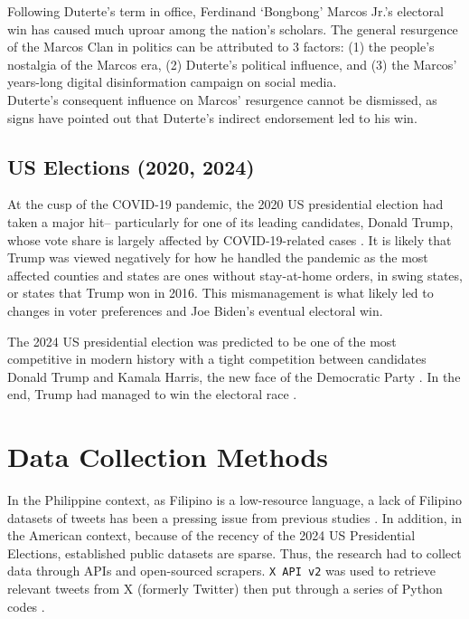 Following Duterte’s term in office, Ferdinand ‘Bongbong’ Marcos Jr.’s electoral win has caused much uproar among the nation’s scholars. The general resurgence of the Marcos Clan in politics can be attributed to 3 factors: (1) the people’s nostalgia of the Marcos era, (2) Duterte’s political influence, and (3) the Marcos’ years-long digital disinformation campaign on social media\cite{RRL_Pernia-2025}. \\Duterte’s consequent influence on Marcos’ resurgence cannot be dismissed, as signs have pointed out that Duterte’s indirect endorsement led to his win\cite{RRL_Dulay-2023}.

\subsection{US Elections (2020, 2024)}
At the cusp of the COVID-19 pandemic, the 2020 US presidential election had taken a major hit– particularly for one of its leading candidates, Donald Trump, whose vote share is largely affected by COVID-19-related cases \cite{RRL_Baccini-2021}. It is likely that Trump was viewed negatively for how he handled the pandemic as the most affected counties and states are ones without stay-at-home orders, in swing states, or states that Trump won in 2016. This mismanagement is what likely led to changes in voter preferences and Joe Biden’s eventual electoral win.

The 2024 US presidential election was predicted to be one of the most competitive in modern history with a tight competition between candidates Donald Trump and Kamala Harris, the new face of the Democratic Party \cite{RRL_Setiawan-2025}. In the end, Trump had managed to win the electoral race \cite{RRL_Setiawan-2025}.

\section{Data Collection Methods}
In the Philippine context, as Filipino is a low-resource language, a lack of Filipino datasets of tweets has been a pressing issue from previous studies \cite{RRL_Aquino-2025}. In addition, in the American context, because of the recency of the 2024 US Presidential Elections, established public datasets are sparse. Thus, the research had to collect data through APIs and open-sourced scrapers. \texttt{X API v2} was used to retrieve relevant tweets from X (formerly Twitter) then put through a series of Python codes \cite{RRL_Ancheta-2020}.

